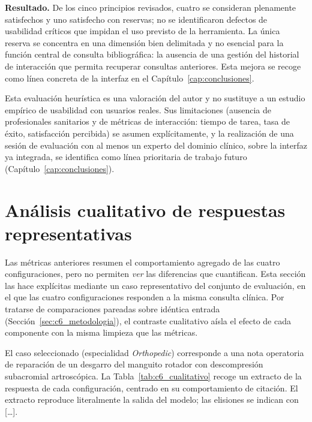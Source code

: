 \documentclass[11pt,a4paper,spanish]{book}
\numberwithin{equation}{chapter}
\numberwithin{figure}{chapter}
\begin{document}
\textbf{Resultado.} De los cinco principios revisados, cuatro se consideran plenamente satisfechos y uno satisfecho con reservas; no se identificaron defectos de usabilidad críticos que impidan el uso previsto de la herramienta. La única reserva se concentra en una dimensión bien delimitada y no esencial para la función central de consulta bibliográfica: la ausencia de una gestión del historial de interacción que permita recuperar consultas anteriores. Esta mejora se recoge como línea concreta de la interfaz en el Capítulo~\ref{cap:conclusiones}.

Esta evaluación heurística es una valoración del autor y no sustituye a un estudio empírico de usabilidad con usuarios reales. Sus limitaciones (ausencia de profesionales sanitarios y de métricas de interacción: tiempo de tarea, tasa de éxito, satisfacción percibida) se asumen explícitamente, y la realización de una sesión de evaluación con al menos un experto del dominio clínico, sobre la interfaz ya integrada, se identifica como línea prioritaria de trabajo futuro (Capítulo~\ref{cap:conclusiones}).

\section{Análisis cualitativo de respuestas representativas}
\label{sec:c6_cualitativo}

Las métricas anteriores resumen el comportamiento agregado de las cuatro configuraciones, pero no permiten \emph{ver} las diferencias que cuantifican. Esta sección las hace explícitas mediante un caso representativo del conjunto de evaluación, en el que las cuatro configuraciones responden a la misma consulta clínica. Por tratarse de comparaciones pareadas sobre idéntica entrada (Sección~\ref{sec:c6_metodologia}), el contraste cualitativo aísla el efecto de cada componente con la misma limpieza que las métricas.

El caso seleccionado (especialidad \textit{Orthopedic}) corresponde a una nota operatoria de reparación de un desgarro del manguito rotador con descompresión subacromial artroscópica. La Tabla~\ref{tab:c6_cualitativo} recoge un extracto de la respuesta de cada configuración, centrado en su comportamiento de citación. El extracto reproduce literalmente la salida del modelo; las elisiones se indican con \textnormal{[\ldots]}.
\end{document}
